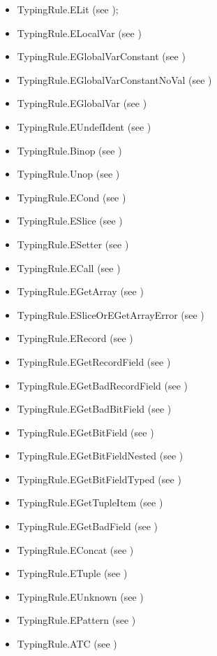 \documentclass{book}
\begin{document}
\begin{itemize}
\item TypingRule.ELit (see );
\item TypingRule.ELocalVar (see )
\item TypingRule.EGlobalVarConstant (see )
\item TypingRule.EGlobalVarConstantNoVal (see )
\item TypingRule.EGlobalVar (see )
\item TypingRule.EUndefIdent (see )
\item TypingRule.Binop (see )
\item TypingRule.Unop (see )
\item TypingRule.ECond (see )
\item TypingRule.ESlice (see )
\item TypingRule.ESetter (see )
\item TypingRule.ECall (see )
\item TypingRule.EGetArray (see )
\item TypingRule.ESliceOrEGetArrayError (see )
\item TypingRule.ERecord (see )
\item TypingRule.EGetRecordField (see )
\item TypingRule.EGetBadRecordField (see )
\item TypingRule.EGetBadBitField (see )
\item TypingRule.EGetBitField (see )
\item TypingRule.EGetBitFieldNested (see )
\item TypingRule.EGetBitFieldTyped (see )
\item TypingRule.EGetTupleItem (see )
\item TypingRule.EGetBadField (see )
\item TypingRule.EConcat (see )
\item TypingRule.ETuple (see )
\item TypingRule.EUnknown (see )
\item TypingRule.EPattern (see )
\item TypingRule.ATC (see )
\end{itemize}
\end{document}
